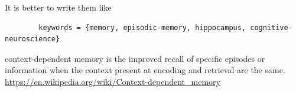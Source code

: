 \documentclass[a4paper]{article}
\title{}
\date{}
\begin{document}
    \maketitle
    
    It is better to write them like
    \begin{verbatim}
        keywords = {memory, episodic-memory, hippocampus, cognitive-neuroscience}
    \end{verbatim}
    context-dependent memory is the improved recall of specific episodes or information when the context present at encoding and retrieval are the same. \url{https://en.wikipedia.org/wiki/Context-dependent_memory}
     
     
\end{document}
